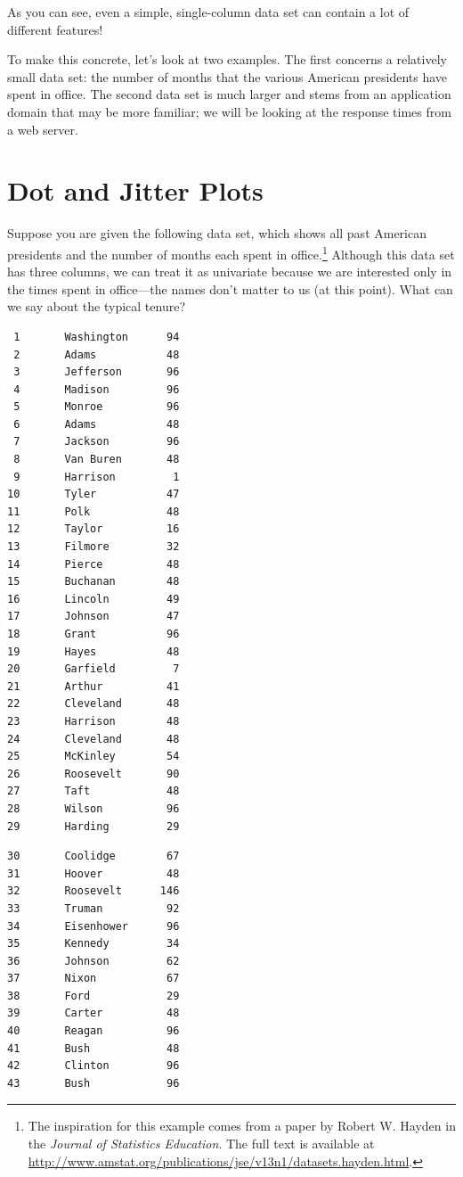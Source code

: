 As you can see, even a simple, single-column data set can contain a
lot of different features!

To make this concrete, let's look at two examples. The first concerns
a relatively small data set: the number of months that the various
American presidents have spent in office.  The second data set is much
larger and stems from an application domain that may be more familiar;
we will be looking at the response times from a web server.

\section{Dot and Jitter Plots}

  
Suppose you are given the following data set, which shows all past
American presidents and the number of months each spent in
office.\footnote{The inspiration for this example comes from a paper
  by Robert W. Hayden in the \textit{Journal of Statistics Education}.
  The full text is available at
  \url{http://www.amstat.org/publications/jse/v13n1/datasets.hayden.html}.}
Although this data set has three columns, we can treat it as
univariate because we are interested only in the times spent in
office---the names don't matter to us (at this point).  What can we
say about the typical tenure?

\begin{verbatim}
 1       Washington      94
 2       Adams           48
 3       Jefferson       96
 4       Madison         96
 5       Monroe          96
 6       Adams           48
 7       Jackson         96
 8       Van Buren       48
 9       Harrison         1
10       Tyler           47
11       Polk            48
12       Taylor          16
13       Filmore         32
14       Pierce          48
15       Buchanan        48
16       Lincoln         49
17       Johnson         47
18       Grant           96
19       Hayes           48
20       Garfield         7
21       Arthur          41
22       Cleveland       48
23       Harrison        48
24       Cleveland       48
25       McKinley        54
26       Roosevelt       90
27       Taft            48
28       Wilson          96
29       Harding         29
\end{verbatim}
\begin{verbatim}
30       Coolidge        67
31       Hoover          48
32       Roosevelt      146
33       Truman          92
34       Eisenhower      96
35       Kennedy         34
36       Johnson         62
37       Nixon           67
38       Ford            29
39       Carter          48
40       Reagan          96
41       Bush            48
42       Clinton         96
43       Bush            96
\end{verbatim}

